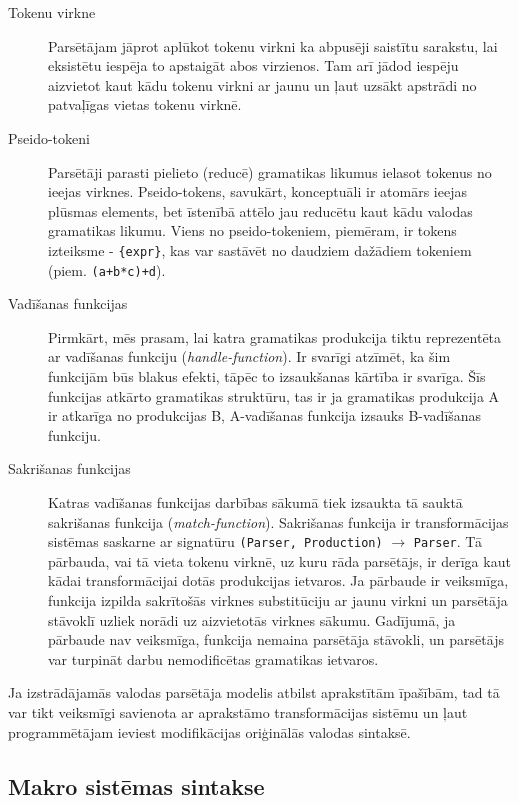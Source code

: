 \begin{description}
\item[Tokenu virkne]
Parsētājam jāprot aplūkot tokenu virkni ka abpusēji saistītu sarakstu, lai eksistētu iespēja to apstaigāt abos virzienos. Tam arī jādod iespēju aizvietot kaut kādu tokenu virkni ar jaunu un ļaut uzsākt apstrādi no patvaļīgas vietas tokenu virknē.

\item[Pseido-tokeni]
Parsētāji parasti pielieto (reducē) gramatikas likumus ielasot tokenus no ieejas virknes. Pseido-tokens, savukārt, konceptuāli ir atomārs ieejas plūsmas elements, bet īstenībā attēlo jau reducētu kaut kādu valodas gramatikas likumu. Viens no pseido-tokeniem, piemēram, ir tokens izteiksme - \verb|{expr}|, kas var sastāvēt no daudziem dažādiem tokeniem (piem. \verb|(a+b*c)+d|).

\item[Vadīšanas funkcijas]
Pirmkārt, mēs prasam, lai katra gramatikas produkcija tiktu reprezentēta ar vadīšanas funkciju (\emph{handle-function}). Ir svarīgi atzīmēt, ka šim funkcijām būs blakus efekti, tāpēc to izsaukšanas kārtība ir svarīga. Šīs funkcijas atkārto gramatikas struktūru, tas ir ja gramatikas produkcija A ir atkarīga no produkcijas B, A-vadīšanas funkcija izsauks B-vadīšanas funkciju. 

\item[Sakrišanas funkcijas]
Katras vadīšanas funkcijas darbības sākumā tiek izsaukta tā sauktā sakrišanas funkcija (\emph{match-function}). Sakrišanas funkcija ir transformācijas sistēmas saskarne ar signatūru \verb|(Parser, Production)| $\to$ \verb|Parser|. Tā pārbauda, vai tā vieta tokenu virknē, uz kuru rāda parsētājs, ir derīga kaut kādai transformācijai dotās produkcijas ietvaros. Ja pārbaude ir veiksmīga, funkcija izpilda sakrītošās virknes substitūciju ar jaunu virkni un parsētāja stāvoklī uzliek norādi uz aizvietotās virknes sākumu. Gadījumā,  ja pārbaude nav veiksmīga, funkcija nemaina parsētāja stāvokli, un parsētājs var turpināt darbu nemodificētas gramatikas ietvaros.
\end{description}

Ja izstrādājamās valodas parsētāja modelis atbilst aprakstītām īpašībām, tad tā var tikt veiksmīgi savienota ar aprakstāmo transformācijas sistēmu un ļaut programmētājam ieviest modifikācijas oriģinālās valodas sintaksē.

\subsection{\label{sbs:sys_macrosyntax}Makro sistēmas sintakse}

